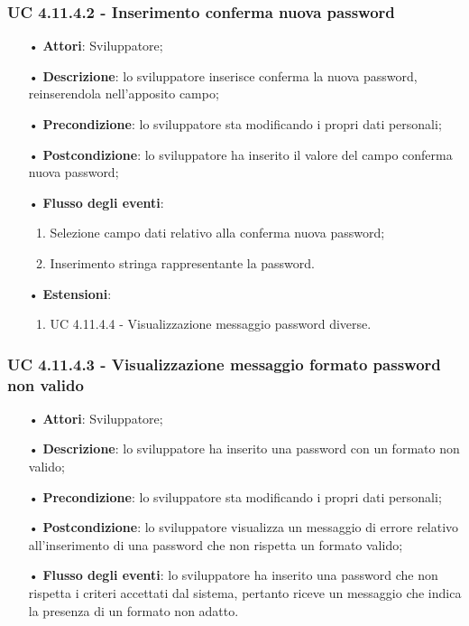 \subsubsection{UC 4.11.4.2 - Inserimento conferma nuova password}
\begin{itemize}
	\item[•]\textbf{Attori}: Sviluppatore;
	\item[•]\textbf{Descrizione}: lo sviluppatore inserisce conferma la nuova password, reinserendola nell'apposito campo;
	\item[•]\textbf{Precondizione}: lo sviluppatore sta modificando i propri dati personali;
	\item[•]\textbf{Postcondizione}: lo sviluppatore ha inserito il valore del campo conferma nuova password; 
	\item[•]\textbf{Flusso degli eventi}: 
	\begin{enumerate}
		\item Selezione campo dati relativo alla conferma nuova password;
		\item Inserimento stringa rappresentante la password.
	\end{enumerate}
	\item[•]\textbf{Estensioni}:
	\begin{enumerate}
		\item UC 4.11.4.4 - Visualizzazione messaggio password diverse.
	\end{enumerate}
\end{itemize}

\subsubsection{UC 4.11.4.3 - Visualizzazione messaggio formato password non valido}
\begin{itemize}
	\item[•]\textbf{Attori}: Sviluppatore;
	\item[•]\textbf{Descrizione}: lo sviluppatore ha inserito una password con un formato non valido;
	\item[•]\textbf{Precondizione}: lo sviluppatore sta modificando i propri dati personali;
	\item[•]\textbf{Postcondizione}: lo sviluppatore visualizza un messaggio di errore relativo all'inserimento di una password che non rispetta un formato valido; 
	\item[•]\textbf{Flusso degli eventi}: lo sviluppatore ha inserito una password che non rispetta i criteri accettati dal sistema, pertanto riceve un messaggio che indica la presenza di un formato non adatto.
\end{itemize}

